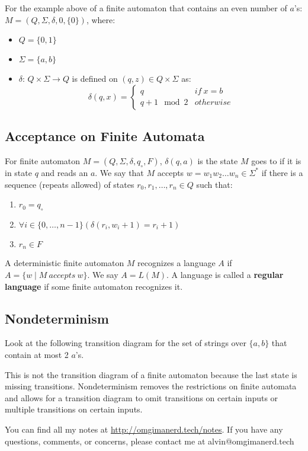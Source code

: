 \documentclass[letterpaper, 12pt]{math}
\begin{document}
For the example above of a finite automaton that contains an even number of
\( a \)'s: \( M = (Q,\Sigma,\delta,0,\{0\}) \), where:
\begin{itemize}
  \item \( Q = \{0,1\} \)
  \item \( \Sigma = \{a,b\} \)
  \item \( \delta \): \( Q\times\Sigma\to Q \) is defined on \( (q,z)\in
    Q\times\Sigma \) as:
    \[ \delta(q,x) = \begin{cases}
      q & if\ x = b \\
      q+1\mod2 & otherwise
    \end{cases} \]
\end{itemize}

\subsection*{Acceptance on Finite Automata}
For finite automaton \( M = (Q,\Sigma,\delta,q_{\circ},F) \), \( \delta(q,a) \)
is the state \( M \) goes to if it is in state \( q \) and reads an \( a \).
We say that \( M \) accepts \( w = w_1w_2\dots w_n\in\Sigma^{*} \) if there is
a sequence (repeats allowed) of states \( r_0,r_1,\dots,r_n\in Q \) such that:
\begin{enumerate}
  \item \( r_0 = q_{\circ} \)
  \item \( \forall{i}\in\{0,\dots,n-1\}(\delta(r_i,w_i+1) = r_i+1) \)
  \item \( r_n \in F \)
\end{enumerate}
A deterministic finite automaton \( M \) recognizes a language \( A \) if
\( A = \{w\mid M\ accepts\ w\} \). We say \( A = L(M) \). A language is called
a \textbf{regular language} if some finite automaton recognizes it.

\subsection*{Nondeterminism}
Look at the following transition diagram for the set of strings over \( \{a,b\}
\) that contain at most 2 \( a \)'s.
\begin{center}
\end{center}
This is not the transition diagram of a finite automaton because the last state
is missing transitions. Nondeterminism removes the restrictions on finite
automata and allows for a transition diagram to omit transitions on certain
inputs or multiple transitions on certain inputs.

\begin{center}
  You can find all my notes at \url{http://omgimanerd.tech/notes}. If you have
  any questions, comments, or concerns, please contact me at
  alvin@omgimanerd.tech
\end{center}
\end{document}
